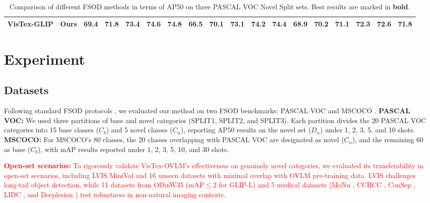 \documentclass[10pt,twocolumn,letterpaper]{article}
\begin{document}
\begin{table}[t]
{\begin{tabular}{cccccccccccccccccc}
    \textbf{VisTex-GLIP} & \multicolumn{1}{c|}{\textbf{Ours}} & \textbf{69.4} & \textbf{71.8} & \textbf{73.4} & \textbf{74.6} & \multicolumn{1}{c|}{\textbf{74.8}} & \textbf{66.5} & \textbf{70.1} & 73.1 & 74.2 & \multicolumn{1}{c|}{\textbf{74.4}} & \textbf{68.9} & \textbf{70.2} & \textbf{71.1} & \textbf{72.3} & \multicolumn{1}{c|}{\textbf{72.6}} & \textbf{71.8} \\ 
     \hline
    \end{tabular}
    }
    \caption{Comparison of different FSOD methods in terms of AP50 on three PASCAL VOC Novel Split sets. Best results are marked in \textbf{bold}.}
    \vskip -0.08in
    \label{tab:pascal-com}
\end{table}

\section{Experiment}
\subsection{Datasets}
Following standard FSOD protocols \cite{wang2020frustratingly, zhang2022metaDETR1}, we evaluated our method on two FSOD benchmarks: PASCAL VOC \cite{everingham2010pascalvoc} and MSCOCO \cite{lin2014microsoftCOCO}. \textbf{PASCAL VOC:} We used three partitions of base and novel categories (SPLIT1, SPLIT2, and SPLIT3). Each partition divides the 20 PASCAL VOC categories into 15 base classes ($C_b$) and 5 novel classes ($C_n$), reporting AP50 results on the novel set ($D_n$) under 1, 2, 3, 5, and 10 shots. \textbf{MSCOCO:} For MSCOCO's 80 classes, the 20 classes overlapping with PASCAL VOC are designated as novel ($C_n$), and the remaining 60 as base ($C_b$), with mAP results reported under 1, 2, 3, 5, 10, and 30 shots.  %

\textcolor{red}{\textbf{Open-set scenarios:} To rigorously validate VisTex-OVLM’s effectiveness on genuinely novel categories, we evaluated its transferability in open-set scenarios, including LVIS MiniVal \cite{gupta2019lvis} and 16 unseen datasets with minimal overlap with OVLM pre-training data. LVIS challenges long-tail object detection, while 11 datasets from ODinW35 \cite{li2022odinw} (mAP$\leq2$ for GLIP-L) and 5 medical datasets (MoNu \cite{kumar2017datasetMONU}, CCRCC \cite{gao2021nuclei}, ConSep \cite{graham2019hover}, LIDC \cite{armato2004lungLIDC}, and Deeplesion \cite{yan2017deeplesion}) test robustness in non-natural imaging contexts.}
\end{document}
